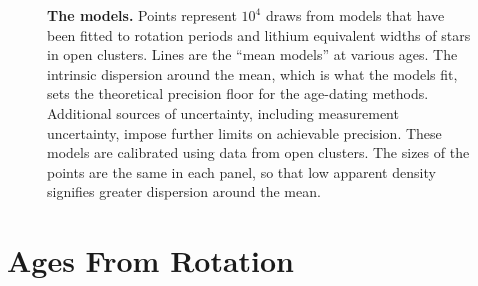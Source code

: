 \documentclass[11pt,twocolumn,tighten,linenumbers,trackchanges]{aastex63}
\begin{document}
\begin{figure}[!t]
	\begin{center}
		\leavevmode
	\end{center}
	\vspace{-0.6cm}
  \caption{{\bf The models.}
    Points represent $10^4$ draws from models that have been fitted to
    rotation periods \citep{Bouma_2023} and lithium equivalent widths
    \citep[EWs;][]{Jeffries_2023} of stars in open clusters.  Lines
    are the ``mean models'' at various ages.  The intrinsic dispersion
    around the mean, which is what the models fit, sets the
    theoretical precision floor for the age-dating methods.
    Additional sources of uncertainty, including measurement
    uncertainty, impose further limits on achievable precision.  These
    models are calibrated using data from open clusters.  The sizes of
    the points are the same in each panel, so that low apparent
    density signifies greater dispersion around the mean.
		\label{fig:models}
	}
\end{figure}


\section{Ages From Rotation}
\label{sec:rotage}
\end{document}
